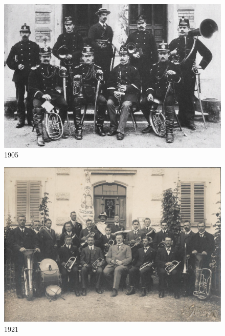 \documentclass[openany]{book}
\begin{document}
\begin{figure}
    \centerline{\includegraphics{./chap/1900-1925/MGH-1905.jpg}}
    \label{fig:mgh-1905}
    \caption{1905}
\end{figure}
\begin{figure}[h]
    \centerline{\includegraphics{./chap/1900-1925/MGH-1921.jpg}}
    \label{fig:mgh-1921}
    \caption{1921}
\end{figure}

\end{document}
